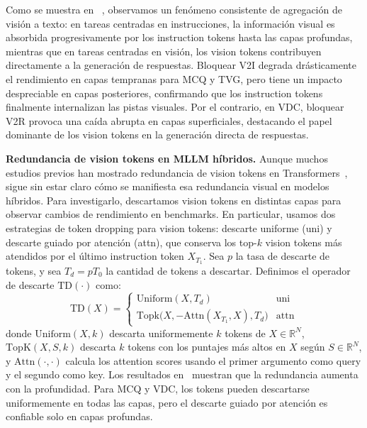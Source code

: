 \documentclass[10pt,twocolumn,letterpaper]{article}
\begin{document}
Como se muestra en ~, observamos un fenómeno consistente de agregación de visión a texto: en tareas centradas en instrucciones, la información visual es absorbida progresivamente por los instruction tokens hasta las capas profundas, mientras que en tareas centradas en visión, los vision tokens contribuyen directamente a la generación de respuestas. 
Bloquear V2I degrada drásticamente el rendimiento en capas tempranas para MCQ y TVG, pero tiene un impacto despreciable en capas posteriores, confirmando que los instruction tokens finalmente internalizan las pistas visuales. 
Por el contrario, en VDC, bloquear V2R provoca una caída abrupta en capas superficiales, destacando el papel dominante de los vision tokens en la generación directa de respuestas. 


\noindent\textbf{Redundancia de vision tokens en MLLM híbridos.}
Aunque muchos estudios previos han mostrado redundancia de vision tokens en Transformers~\cite{chen2024fastv,xing2024pyramiddrop,bolya2022tokenmerge}, sigue sin estar claro cómo se manifiesta esa redundancia visual en modelos híbridos.
Para investigarlo, descartamos vision tokens en distintas capas para observar cambios de rendimiento en benchmarks.
En particular, usamos dos estrategias de token dropping para vision tokens: descarte uniforme (uni) y descarte guiado por atención (attn), que conserva los top-$k$ vision tokens más atendidos por el último instruction token $X_{T_1}$. 
Sea $p$ la tasa de descarte de tokens, y sea $T_d = p T_0$ la cantidad de tokens a descartar.
Definimos el operador de descarte $\mathrm{TD}(\cdot)$ como:
\begin{equation}
    \mathrm{TD}(X)=
    \begin{cases}
        \mathrm{Uniform}(X, T_d) &\text{uni} \\
        {{\mathrm{Topk}}(X,-\text{Attn}(X_{T_1},X),T_d}) &\text{attn}
    \end{cases}
\end{equation}
donde $\mathrm{Uniform}(X,k)$ descarta uniformemente $k$ tokens de $X \in \mathbb{R}^{N}$, $\mathrm{TopK}(X,S,k)$ descarta $k$ tokens con los puntajes más altos en $X$ según $S \in \mathbb{R}^{N}$, y $\mathrm{Attn}(\cdot, \cdot)$ calcula los attention scores usando el primer argumento como query y el segundo como key.
Los resultados en~ muestran que la redundancia aumenta con la profundidad.
Para MCQ y VDC, los tokens pueden descartarse uniformemente en todas las capas, pero el descarte guiado por atención es confiable solo en capas profundas. 
\end{document}
